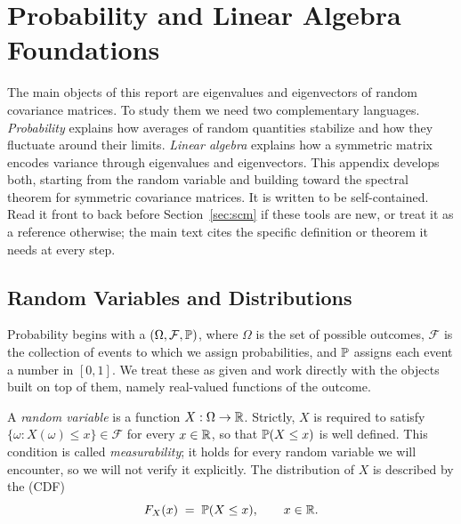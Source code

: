 
\section{Probability and Linear Algebra Foundations}\label{sec:foundations}

The main objects of this report are eigenvalues and eigenvectors of random covariance matrices. To study them we need two complementary languages. \emph{Probability} explains how averages of random quantities stabilize and how they fluctuate around their limits. \emph{Linear algebra} explains how a symmetric matrix encodes variance through eigenvalues and eigenvectors. This appendix develops both, starting from the random variable and building toward the spectral theorem for symmetric covariance matrices. It is written to be self-contained. Read it front to back before Section~\ref{sec:scm} if these tools are new, or treat it as a reference otherwise; the main text cites the specific definition or theorem it needs at every step.

\subsection{Random Variables and Distributions}\label{subsec:rvs}

Probability begins with a  \((\Omega, \mathcal{F}, \mathbb{P})\), where \(\Omega\) is the set of possible outcomes, \(\mathcal{F}\) is the collection of events to which we assign probabilities, and \(\mathbb{P}\) assigns each event a number in \([0, 1]\). We treat these as given and work directly with the objects built on top of them, namely real-valued functions of the outcome.

\begin{definition}\label{def:rv}
A \emph{random variable} is a function \(X: \Omega \to \mathbb{R}\). Strictly, \(X\) is required to satisfy \(\{\omega : X(\omega) \le x\} \in \mathcal{F}\) for every \(x \in \mathbb{R}\), so that \(\mathbb{P}(X \le x)\) is well defined. This condition is called \emph{measurability}; it holds for every random variable we will encounter, so we will not verify it explicitly. The distribution of \(X\) is described by the  (CDF)
\[
  F_X(x) \;=\; \mathbb{P}(X \le x), \qquad x \in \mathbb{R}.
\]
\end{definition}

